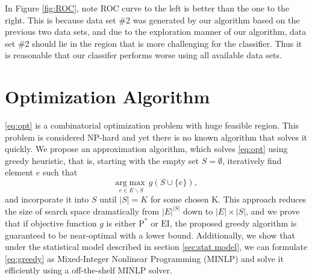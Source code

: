 \documentclass[opre,nonblindrev]{informs3} %
\newcommand{\EI}{\mathrm{EI}}
\newcommand{\PI}{\text{P}^*}
\begin{document}
In Figure \ref{fig:ROC}, note ROC curve to the left is better than the one to the right. This is because data set \#2 was generated by our algorithm based on the previous two data sets, and due to the exploration manner of our algorithm, data set \#2 should lie in the region that is more challenging for the classifier. Thus it is reasonable that our classifer performs worse using all available data sets. 

\section{Optimization Algorithm}
\eqref{eq:opt} is a combinatorial optimization problem with huge feasible region. This problem is considered NP-hard and yet there is no known algorithm that solves it quickly. We propose an approximation algorithm, which solves \eqref{eq:opt} using greedy heuristic, that is, starting with the empty set $S=\emptyset$, iteratively find element $e$ such that 
\begin{equation} \label{eq:greedy}
  \underset{e \in E \backslash S}{\mathrm{arg}\max} \,g(S \cup \{e\}),
\end{equation}
and incorporate it into $S$ until $|S|=K$ for some chosen K. This approach reduces the size of search space dramatically from $|E|^{|S|}$ down to $|E| \times |S|$, and we prove that if objective function $g$ is either $\PI$ or $\EI$, the proposed greedy algorithm is guaranteed to be near-optimal with a lower bound. Additionally, we show that under the statistical model described in section \ref{sec:stat model}, we can formulate \eqref{eq:greedy} as Mixed-Integer Nonlinear Programming
(MINLP) and solve it efficiently using a off-the-shelf MINLP solver.
\end{document}
